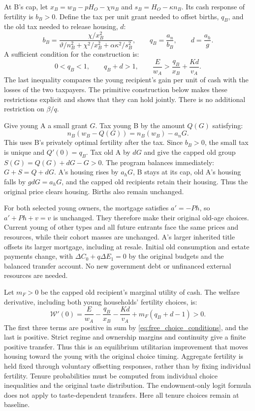 \documentclass[11pt]{article}
\begin{document}
At B's cap, let $x_B=w_B-pH_O-\chi n_B$ and $s_B=H_O-\kappa n_B$.
Its cash response of fertility is $b_B>0$. Define the tax per unit grant
needed to offset births, $q_B$, and the old tax needed to release housing, $d$:
\begin{equation}
b_B=\frac{\chi/x_B^2}
 {\vartheta/n_B^2+\chi^2/x_B^2+\alpha\kappa^2/s_B^2},
\qquad q_B=\frac{a_n}{b_B},\qquad d=\frac{a_h}{g}.
\end{equation}
A sufficient condition for the construction is:
\begin{equation}
0<q_B<1,\qquad q_B+d>1,\qquad
\frac E{w_A}>\frac{q_B}{x_B}+\frac{Kd}{v_A}.
\label{eq:free_choice_conditions}
\end{equation}
The last inequality compares the young recipient's gain per unit of cash
with the losses of the two taxpayers. The primitive construction below
makes these restrictions explicit and shows that they can hold jointly.
There is no additional restriction on $\beta/q$.

Give young A a small grant $G$. Tax young B by the amount $Q(G)$ satisfying:
\begin{equation}
n_B(w_B-Q(G))=n_B(w_B)-a_nG.
\end{equation}
This uses B's privately optimal fertility after the tax. Since $b_B>0$, the
small tax is unique and $Q'(0)=q_B$. Tax old A by $dG$ and give the capped
old group $S(G)=Q(G)+dG-G>0$. The program balances immediately:
$G+S=Q+dG$. A's housing rises by $a_hG$, B stays at its cap, old A's
housing falls by $gdG=a_hG$, and the capped old recipients retain their
housing. Thus the original price clears housing. Births also remain unchanged.

For both selected young owners, the mortgage satisfies $a'=-Ph$, so
$a'+Ph+v=v$ is unchanged. They therefore make their original old-age
choices. Current young of other types and all future entrants face the
same prices and resources, while their cohort masses are unchanged.
A's larger inherited title offsets its larger mortgage, including at resale.
Initial old consumption and estate payments change, with
$\Delta C_0+q\Delta E_1=0$ by the original budgets and the balanced transfer
account. No new government debt or unfinanced external resources are needed.

Let $m_F>0$ be the capped old recipient's marginal utility of cash. The
welfare derivative, including both young households' fertility choices, is:
\begin{equation}
\mathcal W'(0)=\frac E{w_A}-\frac{q_B}{x_B}-\frac{Kd}{v_A}
 +m_F(q_B+d-1)>0.
\end{equation}
The first three terms are positive in sum by
\eqref{eq:free_choice_conditions}, and the last is positive. Strict regime
and ownership margins and continuity give a finite positive transfer.
Thus this is an equilibrium utilitarian improvement that moves housing
toward the young with the original choice timing. Aggregate fertility is
held fixed through voluntary offsetting responses, rather than by fixing
individual fertility. Tenure probabilities must be computed from individual choice inequalities
and the original taste distribution. The endowment-only logit formula does
not apply to taste-dependent transfers. Here all tenure choices remain at
baseline.
\end{document}
